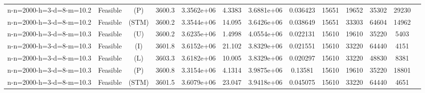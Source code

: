 \documentclass[landscape, a4paper]{article}
\newcommand{\STM}{\ensuremath{\mathrm{STM}}}
\newcommand{\Improved}{\ensuremath{\mathrm{I}}}
\newcommand{\Loose}{\ensuremath{\mathrm{L}}}
\newcommand{\Profit}{\ensuremath{\mathrm{P}}}
\newcommand{\Utility}{\ensuremath{\mathrm{U}}}
\begin{document}
\begin{center}
\begin{tabular}{lcccccccccccc}
n-n=2000-h=3-d=8-m=10.2 & Feasible & (\Profit) & 3600.3 & 3.3562e+06 & 4.3383 & 3.6881e+06 & 0.036423 & 15651 & 19652 & 35302 & 29230 & \\
n-n=2000-h=3-d=8-m=10.2 & Feasible & (\STM) & 3600.2 & 3.3544e+06 & 14.095 & 3.6426e+06 & 0.038649 & 15651 & 33303 & 64604 & 14962 & \\
n-n=2000-h=3-d=8-m=10.3 & Feasible & (\Utility) & 3600.2 & 3.6235e+06 & 1.4998 & 4.0554e+06 & 0.022131 & 15610 & 19610 & 35220 & 5403 & \\
n-n=2000-h=3-d=8-m=10.3 & Feasible & (\Improved) & 3601.8 & 3.6152e+06 & 21.102 & 3.8329e+06 & 0.021551 & 15610 & 33220 & 64440 & 4151 & \\
n-n=2000-h=3-d=8-m=10.3 & Feasible & (\Loose) & 3603.3 & 3.6182e+06 & 10.005 & 3.8329e+06 & 0.020297 & 15610 & 33220 & 48830 & 8381 & \\
n-n=2000-h=3-d=8-m=10.3 & Feasible & (\Profit) & 3600.8 & 3.3154e+06 & 4.1314 & 3.9875e+06 & 0.13581 & 15610 & 19610 & 35220 & 18801 & \\
n-n=2000-h=3-d=8-m=10.3 & Feasible & (\STM) & 3601.5 & 3.6079e+06 & 23.047 & 3.9418e+06 & 0.045075 & 15610 & 33220 & 64440 & 4651 & \\
\end{tabular}
\end{center}
\end{document}
